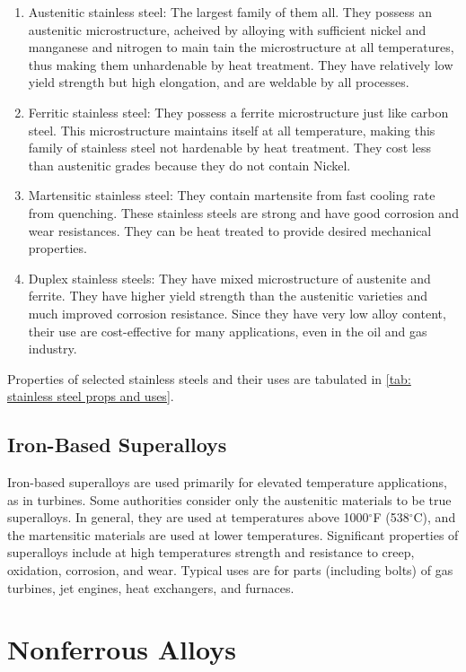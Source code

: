 \documentclass[
10pt,
a4paper,
openany,
svgnames,
]{book}
\begin{document}
\begin{enumerate}
\item Austenitic stainless steel: The largest family of them all. They possess an austenitic microstructure, acheived by alloying with sufficient nickel and manganese and nitrogen to main tain the microstructure at all temperatures, thus making them unhardenable by heat treatment. They have relatively low yield strength but high elongation, and are weldable by all processes.
\item Ferritic stainless steel: They possess a ferrite microstructure just like carbon steel. This microstructure maintains itself at all temperature, making this family of stainless steel not hardenable by heat treatment. They cost less than austenitic grades because they do not contain Nickel.
\item Martensitic stainless steel: They contain martensite from fast cooling rate from quenching. These stainless steels are strong and have good corrosion and wear resistances. They can be heat treated to provide desired mechanical properties.
\item Duplex stainless steels: They have mixed microstructure of austenite and ferrite. They have higher yield strength than the austenitic varieties and much improved corrosion resistance. Since they have very low alloy content, their use are cost-effective for many applications, even in the oil and gas industry.
\end{enumerate}

Properties of selected stainless steels and their uses are tabulated in \cref{tab: stainless steel props and uses}. 

\subsection{Iron-Based Superalloys}

Iron-based superalloys are used primarily for elevated temperature applications, as in turbines. Some authorities consider only the austenitic materials to be true superalloys. In general, they are used at temperatures above 1000$^{\circ}$F (538$^{\circ}$C), and the martensitic materials are used at lower temperatures. Significant properties of superalloys include at high temperatures strength and resistance to creep, oxidation, corrosion, and wear. Typical uses are for parts (including bolts) of gas turbines, jet engines, heat exchangers, and furnaces.

\section{Nonferrous Alloys}
\end{document}
